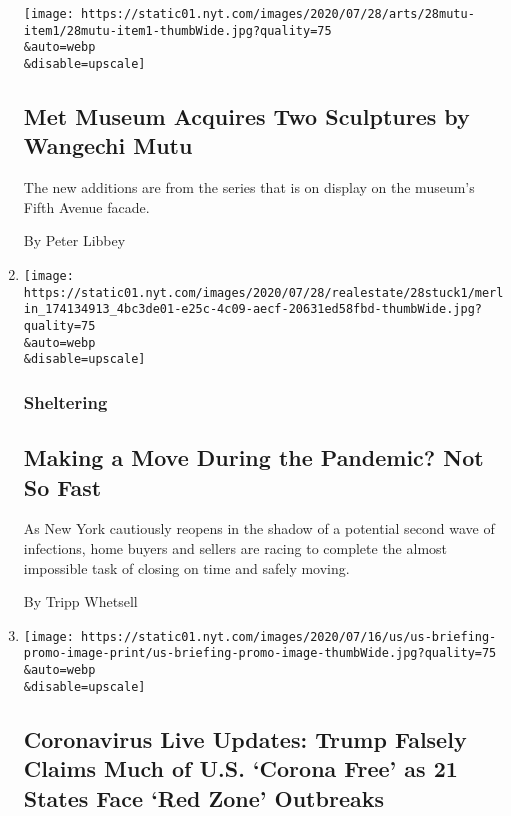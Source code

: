 \begin{enumerate}
  \texttt{[image: https://static01.nyt.com/images/2020/07/28/arts/28mutu-item1/28mutu-item1-thumbWide.jpg?quality=75\\\&auto=webp\\\&disable=upscale]}

  \hypertarget{met-museum-acquires-two-sculptures-by-wangechi-mutu}{%
  \subsection{Met Museum Acquires Two Sculptures by Wangechi
  Mutu}\label{met-museum-acquires-two-sculptures-by-wangechi-mutu}}

  The new additions are from the series that is on display on the
  museum's Fifth Avenue facade.

  By Peter Libbey
\item
  \href{/2020/07/28/realestate/buying-selling-moving-during-coronavirus.html}{}

  \texttt{[image: https://static01.nyt.com/images/2020/07/28/realestate/28stuck1/merlin\_174134913\_4bc3de01-e25c-4c09-aecf-20631ed58fbd-thumbWide.jpg?quality=75\\\&auto=webp\\\&disable=upscale]}

  \hypertarget{sheltering}{%
  \subsubsection{Sheltering}\label{sheltering}}

  \hypertarget{making-a-move-during-the-pandemic-not-so-fast}{%
  \subsection{Making a Move During the Pandemic? Not So
  Fast}\label{making-a-move-during-the-pandemic-not-so-fast}}

  As New York cautiously reopens in the shadow of a potential second
  wave of infections, home buyers and sellers are racing to complete the
  almost impossible task of closing on time and safely moving.

  By Tripp Whetsell
\item
  \href{/2020/07/28/world/coronavirus-covid-19.html}{}

  \texttt{[image: https://static01.nyt.com/images/2020/07/16/us/us-briefing-promo-image-print/us-briefing-promo-image-thumbWide.jpg?quality=75\\\&auto=webp\\\&disable=upscale]}

  \hypertarget{coronavirus-live-updates-trump-falsely-claims-much-of-us-corona-free-as-21-states-face-red-zone-outbreaks}{%
  \subsection{Coronavirus Live Updates: Trump Falsely Claims Much of
  U.S. `Corona Free' as 21 States Face `Red Zone'
  Outbreaks}\label{coronavirus-live-updates-trump-falsely-claims-much-of-us-corona-free-as-21-states-face-red-zone-outbreaks}}


\end{enumerate}
